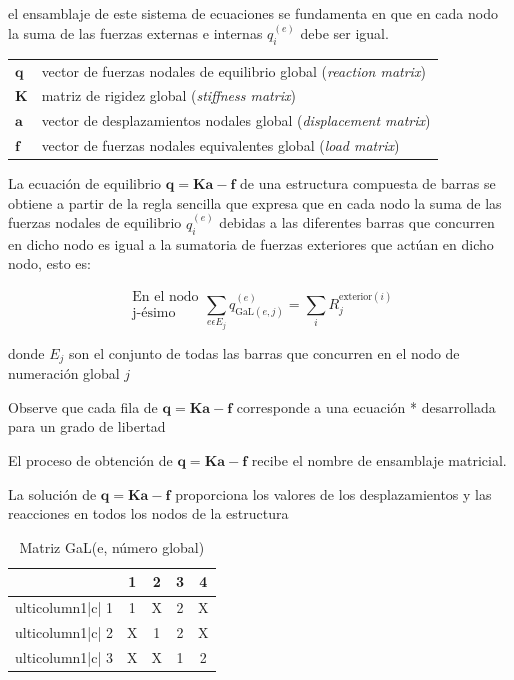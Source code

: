 \documentclass[12pt,letterpaper]{article}
\begin{document}
el ensamblaje de este sistema de ecuaciones se fundamenta en que en cada nodo la suma de las fuerzas externas e internas \(q_i^{(e)}\) debe ser igual.

\begin{tabular}{ll}
	$\mathbf{q}$ & vector de fuerzas nodales de equilibrio global (\textit{reaction matrix}) \\
	$\mathbf{K}$ & matriz de rigidez global (\textit{stiffness matrix}) \\
	$\mathbf{a}$ & vector de desplazamientos nodales global (\textit{displacement matrix}) \\
	$\mathbf{f}$ & vector de fuerzas nodales equivalentes global (\textit{load matrix}) \\
\end{tabular}

La ecuación de equilibrio \(\mathbf{q}= \mathbf{Ka}-\mathbf{f}\) de una estructura compuesta de barras se obtiene a partir de la regla sencilla que expresa que en cada nodo la suma de las fuerzas nodales de equilibrio \(q_i^{(e)}\) debidas a las diferentes barras que concurren en dicho nodo es igual a la sumatoria de fuerzas exteriores que actúan en dicho nodo, esto es:

\begin{equation}
	\substack{\text{En el nodo}\\ \text{j-ésimo}} \sum_{e \epsilon E_j} q_{\text{GaL}(e,j)}^{(e)} = \sum_i R_j^{\text{exterior}(i)}
\end{equation}

donde \(E_j\) son el conjunto de todas las barras que concurren en el nodo de numeración global \(j\)

Observe que cada fila de \(\mathbf{q}= \mathbf{Ka}-\mathbf{f}\) corresponde a una ecuación * desarrollada para un grado de libertad

El proceso de obtención de \(\mathbf{q}= \mathbf{Ka}-\mathbf{f}\) recibe el nombre de ensamblaje matricial.

La solución de \(\mathbf{q}= \mathbf{Ka}-\mathbf{f}\) proporciona los valores de los desplazamientos y las reacciones en todos los nodos de la estructura

\begin{table}[h]
	\centering
	\begin{tabular}{c|c|c|c|c|}
		\cline{2-5}
		& {\color[HTML]{3166FF} 1} & {\color[HTML]{3166FF} 2} & {\color[HTML]{3166FF} 3} & {\color[HTML]{3166FF} 4} \\ \hline
		ulticolumn{1}{|c|}{{\color[HTML]{3166FF} 1}} & 1 & X & 2 & X \\ \hline
		ulticolumn{1}{|c|}{{\color[HTML]{3166FF} 2}} & X & 1 & 2 & X \\ \hline
		ulticolumn{1}{|c|}{{\color[HTML]{3166FF} 3}} & X & X & 1 & 2 \\ \hline
	\end{tabular}
	\caption{Matriz GaL(e, número global)}
	\label{tab:GaL}
\end{table}
\end{document}
